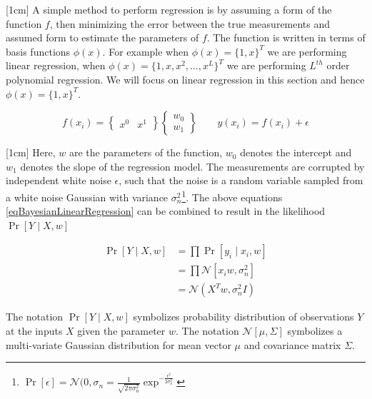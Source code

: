 [1cm]
A simple method to perform regression is by assuming a form of the function $f$, then minimizing the error between the true measurements and assumed form to estimate the parameters of $f$. The function is written in terms of basis functions $\phi(x)$. For example when $\phi(x) = \{1, x\}^{T}$ we are performing linear regression, when $\phi(x) = \{1, x, x^{2}, \ldots, x^{L}\}^{T}$ we are performing $L^{th}$ order polynomial regression. We will focus on linear regression in this section and hence $\phi(x) = \{1, x\}^{T}$.

\begin{equation}\label{eqBayesianLinearRegression}
f(x_{i}) = \begin{Bmatrix}
x^{0} & x^{1}
\end{Bmatrix}  \begin{Bmatrix}
w_{0}\\ 
w_{1}
\end{Bmatrix}
\quad \quad y(x_{i}) = f(x_{i}) + \epsilon
\end{equation}

[1cm]
Here, $w$ are the parameters of the function, $w_{0}$ denotes the intercept and $w_{1}$ denotes the slope of the regression model. The measurements are corrupted by independent white noise $\epsilon$, such that the noise is a random variable sampled from a white noise Gaussian with variance $\sigma_{n}^{2}$\footnote{$\Pr[\epsilon] = \mathcal{N}(0, \sigma_{n} = \frac{1}{\sqrt{2\pi\sigma_{n}^{2}}}\exp^{-\frac{\epsilon^{2}}{2\sigma_{n}^{2}}}
$}. The above equations \ref{eqBayesianLinearRegression} can be combined to result in the likelihood $\Pr[Y\mid X, w]$

\begin{equation}\label{eqBayesianLikelihood}
\begin{aligned}
\Pr[Y \mid X, w]  & = \prod \Pr[y_{i}\mid x_{i}, w]\\
                & = \prod \mathcal{N}[x_{i}w , \sigma_{n}^{2}]\\
                & = \mathcal{N}(X^{T} w, \sigma_{n}^{2}I)    
\end{aligned}
\end{equation}

The notation $\Pr[Y \mid X, w]$ symbolizes probability distribution of observations $Y$ at the inputs $X$ given the parameter $w$. The notation $\mathcal{N}[\mu , \Sigma]$ symbolizes a multi-variate Gaussian distribution for mean vector $\mu$ and covariance matrix $\Sigma$. 

